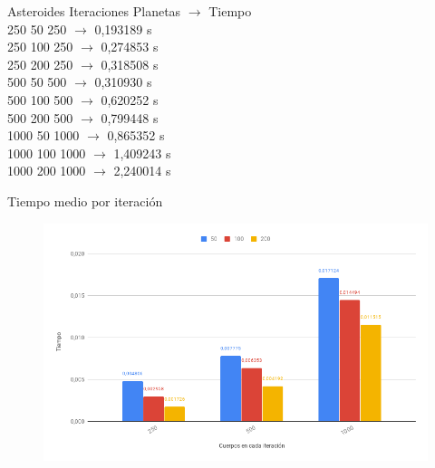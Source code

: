 \documentclass[12pt]{article}
\begin{document}
\begin{enumerate}[label=(\Alph*)]
                \begin{center}
                    \noindent Asteroides Iteraciones Planetas $\rightarrow$ Tiempo \\
                    250 50 250 $\rightarrow$ 0,193189 s \\
                    250 100 250 $\rightarrow$ 0,274853 s \\
                    250 200 250 $\rightarrow$ 0,318508 s \\
                    500 50 500 $\rightarrow$ 0,310930 s \\
                    500 100 500 $\rightarrow$ 0,620252 s \\
                    500 200 500 $\rightarrow$ 0,799448 s \\
                    1000 50 1000 $\rightarrow$ 0,865352 s \\
                    1000 100 1000 $\rightarrow$ 1,409243 s \\
                    1000 200 1000 $\rightarrow$ 2,240014 s \\
                \end{center}
                
                \newpage
                \begin{center}
                    Tiempo medio por iteración
                \end{center}
                \begin{figure}[hbt!]
                    \centering
                    \includegraphics[width=\linewidth]{images/chart8.png}
                \end{figure}
        

\end{enumerate}
\end{document}
